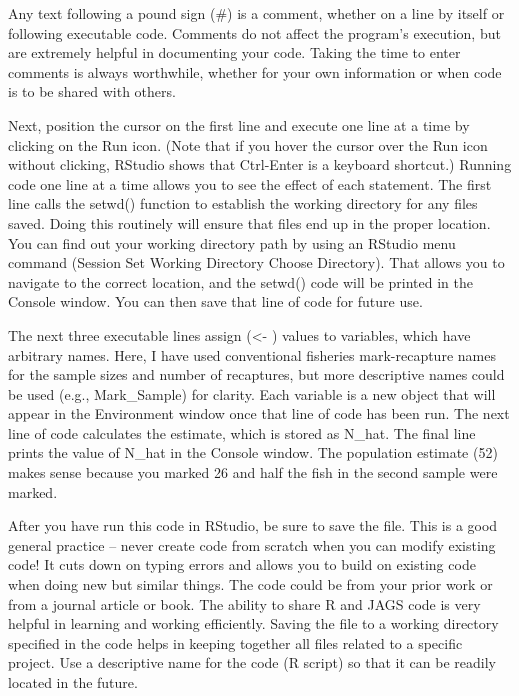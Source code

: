 \documentclass[
]{krantz}
\begin{document}
Any text following a pound sign (\#) is a comment, whether on a line by itself or following executable code. Comments do not affect the program's execution, but are extremely helpful in documenting your code. Taking the time to enter comments is always worthwhile, whether for your own information or when code is to be shared with others.

Next, position the cursor on the first line and execute one line at a time by clicking on the Run icon. (Note that if you hover the cursor over the Run icon without clicking, RStudio shows that Ctrl-Enter is a keyboard shortcut.) Running code one line at a time allows you to see the effect of each statement. The first line calls the setwd() function to establish the working directory for any files saved. Doing this routinely will ensure that files end up in the proper location. You can find out your working directory path by using an RStudio menu command (Session \textbar{} Set Working Directory \textbar{} Choose Directory). That allows you to navigate to the correct location, and the setwd() code will be printed in the Console window. You can then save that line of code for future use.

The next three executable lines assign (\textless- ) values to variables, which have arbitrary names. Here, I have used conventional fisheries mark-recapture names for the sample sizes and number of recaptures, but more descriptive names could be used (e.g., Mark\_Sample) for clarity. Each variable is a new object that will appear in the Environment window once that line of code has been run. The next line of code calculates the estimate, which is stored as N\_hat. The final line prints the value of N\_hat in the Console window. The population estimate (52) makes sense because you marked 26 and half the fish in the second sample were marked.

After you have run this code in RStudio, be sure to save the file. This is a good general practice -- never create code from scratch when you can modify existing code! It cuts down on typing errors and allows you to build on existing code when doing new but similar things. The code could be from your prior work or from a journal article or book. The ability to share R and JAGS code is very helpful in learning and working efficiently. Saving the file to a working directory specified in the code helps in keeping together all files related to a specific project. Use a descriptive name for the code (R script) so that it can be readily located in the future.
\end{document}
